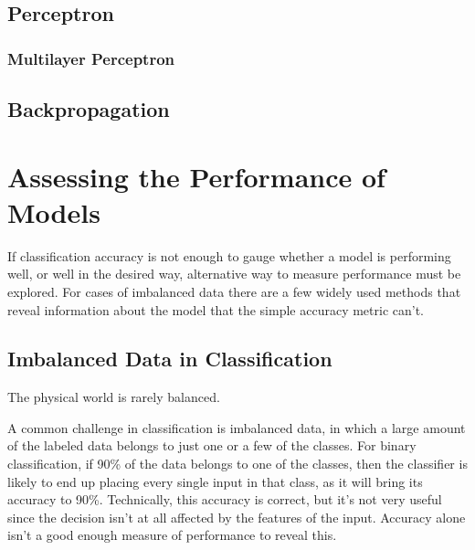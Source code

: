 \subsection{Perceptron}

\subsubsection{Multilayer Perceptron}

\subsection{Backpropagation}

\section{Assessing the Performance of Models}
If classification accuracy is not enough to gauge whether a model is
performing well, or well in the desired way, alternative way to measure
performance must be explored. For cases of imbalanced data there are a few
widely used methods that reveal information about the model that the simple
accuracy metric can't.

\subsection{Imbalanced Data in Classification}
The physical world is rarely balanced.

A common challenge in classification is imbalanced data, in which a large
amount of the labeled data belongs to just one or a few of the classes.
For binary classification, if 90\% of the data belongs to one of the classes,
then the classifier is likely to end up placing every single
input in that class, as it will bring its accuracy to 90\%. Technically, this
accuracy is correct, but it's not very useful since the decision isn't at all
affected by the features of the input. Accuracy alone isn't a good enough
measure of performance to reveal this.


